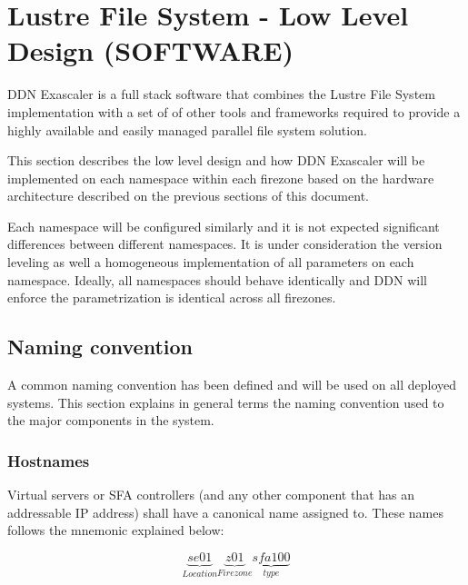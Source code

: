 \documentclass{article}
\begin{document}
\newpage
\section{Lustre File System - Low Level Design (SOFTWARE)}
DDN Exascaler is a full stack software that combines the Lustre File System implementation with a set of of other tools and frameworks required to provide a highly available and easily managed parallel file system solution. 

This section describes the low level design and how DDN Exascaler will be implemented on each namespace within each firezone based on the hardware architecture described on the previous sections of this document.

Each namespace will be configured similarly and it is not expected significant differences between different namespaces. It is under consideration the version leveling as well a homogeneous implementation of all parameters on each namespace. Ideally, all namespaces should behave identically and DDN will enforce the parametrization is identical across all firezones. 

\subsection{Naming convention}
A common naming convention has been defined and will be used on all deployed systems. This section explains in general terms the naming convention used to the major components in the system.

\subsubsection{Hostnames}
Virtual servers or SFA controllers (and any other component that has an addressable IP address) shall have a canonical name assigned to. These names follows the mnemonic explained below:
\begin{center}
    $$
    \underbrace{se01}_{Location}\underbrace{z01}_{Firezone}\underbrace{sfa100}_{type}
    $$
\end{center}

\begin{table}[htbp]
\caption{Naming convention for hostnames and component names }
\label{tab:naming-hostnames-table}
\end{table}
\end{document}
